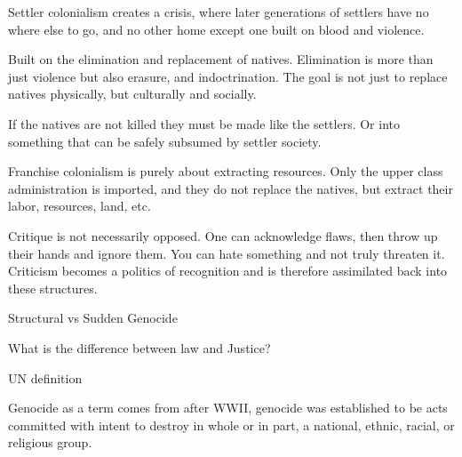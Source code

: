 \documentclass{report}
\begin{document}
\begin{description}
\begin{mdframed}
            Settler colonialism creates a crisis, where
            later generations of settlers have no where
            else to go, and no other home except one built
            on blood and violence.

            Built on the elimination and replacement of
            natives. Elimination is more than just violence
            but also erasure, and indoctrination. The goal is
            not just to replace natives physically, but culturally
            and socially.

            If the natives are not killed they must be made
            like the settlers. Or into something that can be
            safely subsumed by settler society.
        \end{mdframed}
        \begin{mdframed}
            Franchise colonialism is purely about extracting
            resources. Only the upper class administration
            is imported, and they do not replace
            the natives, but extract their labor, resources,
            land, etc.
        \end{mdframed}
        \begin{mdframed}
            Critique is not necessarily opposed. One can
            acknowledge flaws, then throw up their hands
            and ignore them. You can hate something and
            not truly threaten it. Criticism becomes a
            politics of recognition and is therefore
            assimilated back into these structures.
        \end{mdframed}
    \item {\large Structural vs Sudden Genocide}
        \begin{mdframed}
            What is the difference between law and Justice?
        \end{mdframed}
        \pagebreak
    \item {\large UN definition}
        \begin{mdframed}
            Genocide as a term comes from after WWII, 
            genocide was established to be acts committed
            with intent to destroy in whole or in part, a
            national, ethnic, racial, or religious group.

        \begin{center}
        \end{center}


\end{mdframed}
\end{description}
\end{document}
